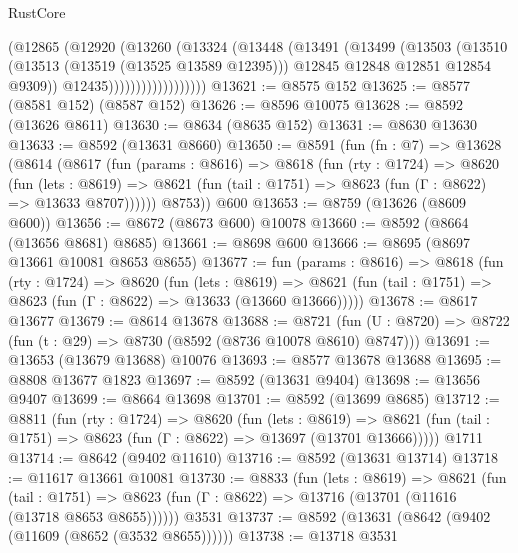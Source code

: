 \begin{lexlean}{RustCore}
\begin{coremodule}
                          (@12865
                            (@12920
                              (@13260
                                (@13324
                                  (@13448
                                    (@13491
                                      (@13499
                                        (@13503
                                          (@13510
                                            (@13513 (@13519 (@13525 @13589 @12395)))
                                            @12845
                                            @12848
                                            @12851
                                            @12854
                                            @9309))
                                        @12435))))))))))))))))))
@13621 := @8575 @152
@13625 := @8577 (@8581 @152) (@8587 @152)
@13626 := @8596 @10075
@13628 := @8592 (@13626 @8611)
@13630 := @8634 (@8635 @152)
@13631 := @8630 @13630
@13633 := @8592 (@13631 @8660)
@13650 := @8591
    (fun (fn : @7) =>
    @13628
      (@8614
        (@8617
          (fun (params : @8616) =>
          @8618
            (fun (rty : @1724) =>
            @8620
              (fun (lets : @8619) =>
              @8621 (fun (tail : @1751) => @8623 (fun (Γ : @8622) => @13633 @8707))))))
        @8753))
    @600
@13653 := @8759 (@13626 (@8609 @600))
@13656 := @8672 (@8673 @600) @10078
@13660 := @8592 (@8664 (@13656 @8681) @8685)
@13661 := @8698 @600
@13666 := @8695 (@8697 @13661 @10081 @8653 @8655)
@13677 := fun (params : @8616) =>
  @8618
    (fun (rty : @1724) =>
    @8620
      (fun (lets : @8619) =>
      @8621 (fun (tail : @1751) => @8623 (fun (Γ : @8622) => @13633 (@13660 @13666)))))
@13678 := @8617 @13677
@13679 := @8614 @13678
@13688 := @8721
    (fun (U : @8720) => @8722 (fun (t : @29) => @8730 (@8592 (@8736 @10078 @8610) @8747)))
@13691 := @13653 (@13679 @13688) @10076
@13693 := @8577 @13678 @13688
@13695 := @8808 @13677 @1823
@13697 := @8592 (@13631 @9404)
@13698 := @13656 @9407
@13699 := @8664 @13698
@13701 := @8592 (@13699 @8685)
@13712 := @8811
    (fun (rty : @1724) =>
    @8620
      (fun (lets : @8619) =>
      @8621 (fun (tail : @1751) => @8623 (fun (Γ : @8622) => @13697 (@13701 @13666)))))
    @1711
@13714 := @8642 (@9402 @11610)
@13716 := @8592 (@13631 @13714)
@13718 := @11617 @13661 @10081
@13730 := @8833
    (fun (lets : @8619) =>
    @8621
      (fun (tail : @1751) =>
      @8623 (fun (Γ : @8622) => @13716 (@13701 (@11616 (@13718 @8653 @8655))))))
    @3531
@13737 := @8592 (@13631 (@8642 (@9402 (@11609 (@8652 (@3532 @8655))))))
@13738 := @13718 @3531

\end{coremodule}
\end{lexlean}
